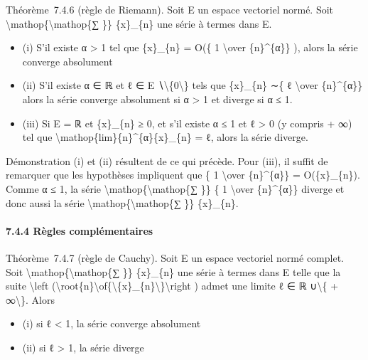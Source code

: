 \documentclass[]{article}
\begin{document}
Théorème~7.4.6 (règle de Riemann). Soit E un espace vectoriel normé.
Soit \textbackslash{}mathop\{\textbackslash{}mathop\{∑ \}\} \{x\}\_\{n\}
une série à termes dans E.

\begin{itemize}
\itemsep1pt\parskip0pt
\item
  (i) S'il existe α \textgreater{} 1 tel que \{x\}\_\{n\} = O(\{ 1
  \textbackslash{}over \{n\}\^{}\{α\}\} ), alors la série converge
  absolument
\item
  (ii) S'il existe α ∈ ℝ et ℓ ∈ E ∖\textbackslash{}\{0\textbackslash{}\}
  tels que \{x\}\_\{n\} ∼\{ ℓ \textbackslash{}over \{n\}\^{}\{α\}\}
  alors la série converge absolument si α \textgreater{} 1 et diverge si
  α ≤ 1.
\item
  (iii) Si E = ℝ et \{x\}\_\{n\} ≥ 0, et s'il existe α ≤ 1 et ℓ
  \textgreater{} 0 (y compris + ∞) tel que
  \textbackslash{}mathop\{lim\}\{n\}\^{}\{α\}\{x\}\_\{n\} = ℓ, alors la
  série diverge.
\end{itemize}

Démonstration (i) et (ii) résultent de ce qui précède. Pour (iii), il
suffit de remarquer que les hypothèses impliquent que \{ 1
\textbackslash{}over \{n\}\^{}\{α\}\} = O(\{x\}\_\{n\}). Comme α ≤ 1, la
série \textbackslash{}mathop\{\textbackslash{}mathop\{∑ \}\} \{ 1
\textbackslash{}over \{n\}\^{}\{α\}\} diverge et donc aussi la série
\textbackslash{}mathop\{\textbackslash{}mathop\{∑ \}\} \{x\}\_\{n\}.

\paragraph{7.4.4 Règles complémentaires}

Théorème~7.4.7 (règle de Cauchy). Soit E un espace vectoriel normé
complet. Soit \textbackslash{}mathop\{\textbackslash{}mathop\{∑ \}\}
\{x\}\_\{n\} une série à termes dans E telle que la suite
\textbackslash{}left
(\textbackslash{}root\{n\}\textbackslash{}of\{\textbackslash{}\textbar{}\{x\}\_\{n\}\textbackslash{}\textbar{}\}\textbackslash{}right
) admet une limite ℓ ∈ ℝ ∪\textbackslash{}\{ + ∞\textbackslash{}\}.
Alors

\begin{itemize}
\itemsep1pt\parskip0pt
\item
  (i) si ℓ \textless{} 1, la série converge absolument
\item
  (ii) si ℓ \textgreater{} 1, la série diverge
\end{itemize}
\end{document}

